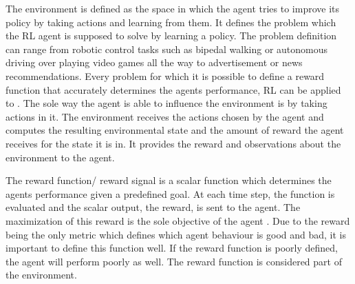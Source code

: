 The environment is defined as the space in which the agent tries to improve its policy by taking actions and learning from them.
It defines the problem which the RL agent is supposed to solve by learning a policy.
The problem definition can range from robotic control tasks such as bipedal walking or autonomous driving over playing video games all the way to advertisement or news recommendations.
Every problem for which it is possible to define a reward function that accurately determines the agents performance, RL can be applied to \parencite{silver2015}.
The sole way the agent is able to influence the environment is by taking actions in it.
The environment receives the actions chosen by the agent and computes the resulting environmental state and the amount of reward the agent receives for the state it is in.
It provides the reward and observations about the environment to the agent.

\begin{comment}
Using the RL toolbox, 2 distinct types of environment are provided which differ in the definition of their action space.
If an environment has a discrete action space, it means that there exists countable, discrete actions which can be taken.
Discrete action spaces are used when the number of possible actions is limited and known in advance.
An example of such an environment would be a game of chess; for each turn there is a finite number of available moves.
Continuous action spaces on the other hand have a continuum of actions which can be taken and are used when the number of possible actions is infinite, such as the movement possibilities of a robotic arm.	
\end{comment}

The reward function/ reward signal is a scalar function which determines the agents performance given a predefined goal.
At each time step, the function is evaluated and the scalar output, the reward, is sent to the agent.
The maximization of this reward is the sole objective of the agent \parencite{silver2015}.
Due to the reward being the only metric which defines which agent behaviour is good and bad, it is important to define this function well.
If the reward function is poorly defined, the agent will perform poorly as well.
The reward function is considered part of the environment.
\parencite{sutton2018reinforcement}

